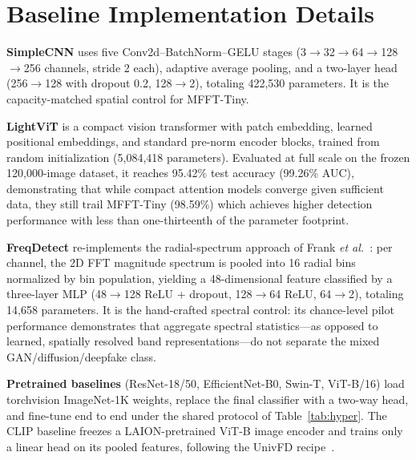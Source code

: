 \documentclass[journal]{IEEEtran}
\begin{document}
\appendices

\section{Baseline Implementation Details}
\label{app:baselines}
\textbf{SimpleCNN} uses five Conv2d--BatchNorm--GELU stages (3$\rightarrow$32$\rightarrow$64$\rightarrow$128$\rightarrow$256 channels, stride 2 each), adaptive average pooling, and a two-layer head (256$\rightarrow$128 with dropout 0.2, 128$\rightarrow$2), totaling 422{,}530 parameters. It is the capacity-matched spatial control for MFFT-Tiny.

\textbf{LightViT} is a compact vision transformer with patch embedding, learned positional embeddings, and standard pre-norm encoder blocks, trained from random initialization (5{,}084{,}418 parameters). Evaluated at full scale on the frozen 120{,}000-image dataset, it reaches 95.42\% test accuracy (99.26\% AUC), demonstrating that while compact attention models converge given sufficient data, they still trail MFFT-Tiny (98.59\%) which achieves higher detection performance with less than one-thirteenth of the parameter footprint.

\textbf{FreqDetect} re-implements the radial-spectrum approach of Frank \textit{et al.}~\cite{frank2020}: per channel, the 2D FFT magnitude spectrum is pooled into 16 radial bins normalized by bin population, yielding a 48-dimensional feature classified by a three-layer MLP (48$\rightarrow$128 ReLU + dropout, 128$\rightarrow$64 ReLU, 64$\rightarrow$2), totaling 14{,}658 parameters. It is the hand-crafted spectral control: its chance-level pilot performance demonstrates that aggregate spectral statistics---as opposed to learned, spatially resolved band representations---do not separate the mixed GAN/diffusion/deepfake class.

\textbf{Pretrained baselines} (ResNet-18/50, EfficientNet-B0, Swin-T, ViT-B/16) load torchvision ImageNet-1K weights, replace the final classifier with a two-way head, and fine-tune end to end under the shared protocol of Table~\ref{tab:hyper}. The CLIP baseline freezes a LAION-pretrained ViT-B image encoder and trains only a linear head on its pooled features, following the UnivFD recipe~\cite{ojha2023}.

\end{document}
